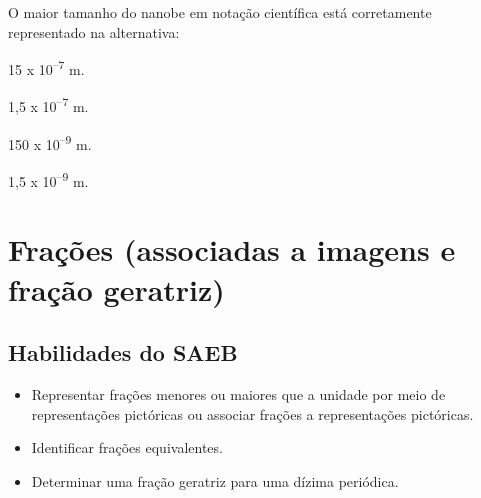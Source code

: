 O maior tamanho do nanobe em notação científica está corretamente
representado na alternativa:

\begin{escolha}
\item 15 x 10\textsuperscript{--7} m.
\item 1,5 x 10\textsuperscript{--7} m.
\item 150 x 10\textsuperscript{--9} m.
\item 1,5 x 10\textsuperscript{--9} m.
\end{escolha}

\chapter{Frações (associadas a imagens e fração geratriz)}

\section*{Habilidades do SAEB}

\begin{itemize}
  \item Representar frações menores ou maiores que a unidade por meio de
representações pictóricas ou associar frações a representações pictóricas.
  \item Identificar frações equivalentes.
  \item Determinar uma fração geratriz para uma dízima periódica.   
\end{itemize} 

